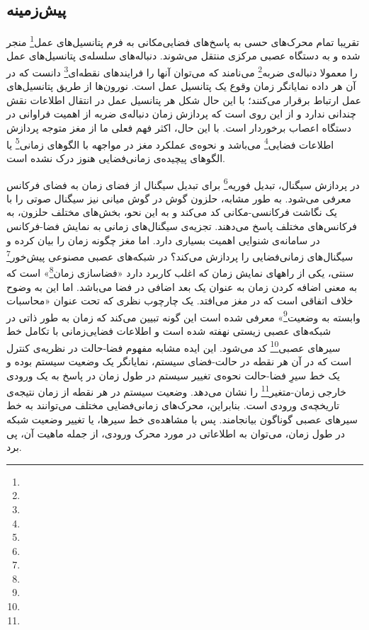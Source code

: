 \subsection{پیش‌زمینه}
تقریبا تمام محرک‌های حسی به پاسخ‌های فضایی‌مکانی به فرم پتانسیل‌های عمل\footnote{} منجر شده و به دستگاه عصبی مرکزی  منتقل می‌شوند. دنباله‌های سلسله‌ی پتانسیل‌های عمل را معمولا دنباله‌ی ضربه\footnote{} می‌نامند که می‌توان آنها را فرایند‌های نقطه‌ای\footnote{} دانست که در آن هر داده نمایانگر زمان وقوع یک پتانسیل عمل است. نورون‌ها از طریق پتانسیل‌های عمل ارتباط برقرار می‌کنند؛ با این حال شکل هر پتانسیل عمل در انتقال اطلاعات نقش چندانی ندارد و از این روی است که پردازش زمان دنباله‌ی ضربه از اهمیت فراوانی در دستگاه اعصاب برخوردار است. با این حال، اکثر فهم فعلی ما از مغز متوجه پردازش اطلاعات فضایی\footnote{} می‌باشد و نحوه‌ی عملکرد مغز در مواجهه با الگوهای زمانی\footnote{} یا الگوهای پیچیده‌ی زمانی‌فضایی هنوز درک نشده است.

در پردازش سیگنال، تبدیل فوریه\footnote{} برای تبدیل سیگنال از فضای زمان به فضای فرکانس معرفی می‌شود. به طور مشابه، حلزون گوش در گوش میانی نیز سیگنال صوتی را با یک نگاشت فرکانسی-مکانی کد می‌کند و به این نحو، بخش‌های مختلف حلزون، به فرکانس‌های مختلف پاسخ می‌دهند. تجزیه‌ی سیگنال‌های زمانی به نمایش فضا-فرکانس در سامانه‌ی شنوایی اهمیت بسیاری دارد. اما مغز چگونه زمان را بیان کرده و سیگنال‌های زمانی‌فضایی را پردازش می‌کند؟ در شبکه‌های عصبی مصنوعی پیش‌خور\footnote{} سنتی، یکی از راههای نمایش زمان که اغلب کاربرد دارد «فضاسازی زمان\footnote{}» است که به معنی اضافه کردن زمان به عنوان یک بعد اضافی در فضا می‌باشد. اما این به وضوح خلاف اتفاقی است که در مغز می‌افتد. یک چارچوب نظری که تحت عنوان «محاسبات وابسته به وضعیت\footnote{}» معرفی شده است\cite{buonomano2009state} این گونه تبیین می‌کند که زمان به طور ذاتی در شبکه‌های عصبی زیستی نهفته شده است و اطلاعات فضایی‌زمانی با تکامل خط سیرهای عصبی\footnote{} کد می‌شود. این ایده مشابه مفهوم فضا-حالت در نظریه‌ی کنترل است که در آن هر نقطه در حالت-فضای سیستم، نمایانگر یک وضعیت سیستم بوده و یک خط سیرِ فضا-حالت نحوه‌ی تغییر سیستم در طول زمان در پاسخ به یک ورودی خارجی زمان-متغیر\footnote{} را نشان می‌دهد. وضعیت سیستم در هر نقطه از زمان نتیجه‌ی تاریخچه‌ی ورودی است. بنابراین، محرک‌های زمانی‌فضایی مختلف می‌توانند به خط سیرهای عصبی گوناگون بیانجامند. پس با مشاهده‌ی خط سیر‌ها، یا تغییر وضعیت شبکه در طول زمان، می‌توان به اطلاعاتی در مورد محرک ورودی، از جمله ماهیت آن، پی برد.

